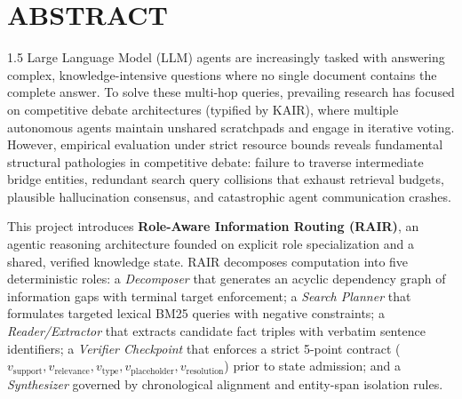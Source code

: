 \documentclass[12pt,a4paper]{report}
\begin{document}
\clearpage

\chapter*{ABSTRACT}
\begin{spacing}{1.5}
Large Language Model (LLM) agents are increasingly tasked with answering complex, knowledge-intensive questions where no single document contains the complete answer. To solve these multi-hop queries, prevailing research has focused on competitive debate architectures (typified by KAIR), where multiple autonomous agents maintain unshared scratchpads and engage in iterative voting. However, empirical evaluation under strict resource bounds reveals fundamental structural pathologies in competitive debate: failure to traverse intermediate bridge entities, redundant search query collisions that exhaust retrieval budgets, plausible hallucination consensus, and catastrophic agent communication crashes.

This project introduces \textbf{Role-Aware Information Routing (RAIR)}, an agentic reasoning architecture founded on explicit role specialization and a shared, verified knowledge state. RAIR decomposes computation into five deterministic roles: a \textit{Decomposer} that generates an acyclic dependency graph of information gaps with terminal target enforcement; a \textit{Search Planner} that formulates targeted lexical BM25 queries with negative constraints; a \textit{Reader/Extractor} that extracts candidate fact triples with verbatim sentence identifiers; a \textit{Verifier Checkpoint} that enforces a strict 5-point contract ($v_{\text{support}}, v_{\text{relevance}}, v_{\text{type}}, v_{\text{placeholder}}, v_{\text{resolution}}$) prior to state admission; and a \textit{Synthesizer} governed by chronological alignment and entity-span isolation rules.


\end{spacing}
\end{document}
